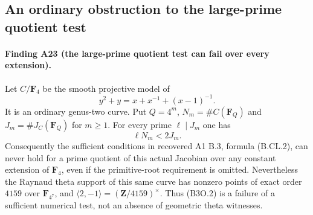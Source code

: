 \subsection{An ordinary obstruction to the large-prime quotient test}
\label{sec:b3-ordinary-obstruction}

\paragraph{Finding A23 (the large-prime quotient test can fail over every extension).}
Let $C/\mathbf F_4$ be the smooth projective model of
\[
                   y^2+y=x+x^{-1}+(x-1)^{-1}.
 \tag{B3O.1}
\]
It is an ordinary genus-two curve.  Put
$Q=4^m$, $N_m=\#C(\mathbf F_Q)$ and
$J_m=\#J_C(\mathbf F_Q)$ for $m\ge1$.
For every prime $\ell\mid J_m$ one has
\[
                              \ell N_m<2J_m.
 \tag{B3O.2}
\]
Consequently the sufficient conditions in recovered A1
B.3, formula (B.CL.2), can never hold for a prime quotient
of this actual Jacobian over any constant extension of
$\mathbf F_4$, even if the primitive-root requirement is omitted.
Nevertheless the Raynaud theta support of this same curve has
nonzero points of exact order $4159$ over $\mathbf F_{4^7}$,
and $\langle2,-1\rangle=(\mathbf Z/4159)^\times$.
Thus (B3O.2) is a failure of a sufficient numerical test, not
an absence of geometric theta witnesses.

